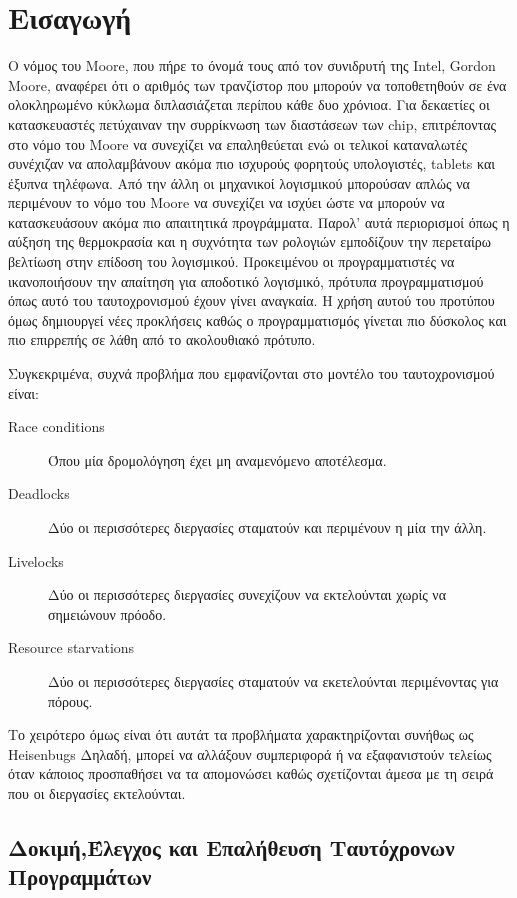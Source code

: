 \chapter {Εισαγωγή}


Ο νόμος του Moore, που πήρε το όνομά τους από τον συνιδρυτή της Intel, Gordon Moore, αναφέρει ότι ο αριθμός των τρανζίστορ που
μπορούν να τοποθετηθούν σε ένα ολοκληρωμένο κύκλωμα διπλασιάζεται περίπου κάθε δυο χρόνιοα. Για δεκαετίες οι κατασκευαστές 
πετύχαιναν την συρρίκνωση των διαστάσεων των chip, επιτρέποντας στο νόμο του Moore να συνεχίζει να επαληθεύεται ενώ οι 
τελικοί καταναλωτές συνέχιζαν να απολαμβάνουν ακόμα πιο ισχυρούς φορητούς υπολογιστές, tablets και έξυπνα τηλέφωνα. Από την
άλλη οι μηχανικοί λογισμικού μπορούσαν απλώς να περιμένουν το νόμο του Moore να συνεχίζει να ισχύει ώστε να μπορούν να κατασκευάσουν
ακόμα πιο απαιτητικά προγράμματα. Παρολ' αυτά περιορισμοί όπως η αύξηση της θερμοκρασία και η συχνότητα των ρολογιών εμποδίζουν
την περεταίρω βελτίωση στην επίδοση του λογισμικού. Προκειμένου οι προγραμματιστές να ικανοποιήσουν την απαίτηση για αποδοτικό
λογισμικό, πρότυπα προγραμματισμού όπως αυτό του ταυτοχρονισμού έχουν γίνει αναγκαία. Η χρήση αυτού του προτύπου όμως δημιουργεί νέες 
προκλήσεις καθώς ο προγραμματισμός γίνεται πιο δύσκολος και πιο επιρρεπής σε λάθη από το ακολουθιακό πρότυπο.
 
Συγκεκριμένα, συχνά προβλήμα που εμφανίζονται στο μοντέλο του ταυτοχρονισμού είναι:
\begin{description}
\item[Race conditions] Όπου μία δρομολόγηση έχει μη αναμενόμενο αποτέλεσμα. 
\item[Deadlocks] Δύο οι περισσότερες διεργασίες σταματούν και περιμένουν η μία την άλλη.
\item[Livelocks] Δύο οι περισσότερες διεργασίες συνεχίζουν να εκτελούνται χωρίς να σημειώνουν πρόοδο.
\item[Resource starvations] Δύο οι περισσότερες διεργασίες σταματούν να εκετελούνται περιμένοντας για πόρους.
\end{description}
Το χειρότερο όμως είναι ότι αυτάτ τα προβλήματα χαρακτηρίζονται συνήθως ως Heisenbugs
Δηλαδή, μπορεί να αλλάξουν συμπεριφορά ή να εξαφανιστούν τελείως όταν κάποιος προσπαθήσει να τα απομονώσει καθώς 
σχετίζονται άμεσα με τη σειρά που οι διεργασίες εκτελούνται.

\section{Δοκιμή,Έλεγχος και Επαλήθευση Ταυτόχρονων Προγραμμάτων}

